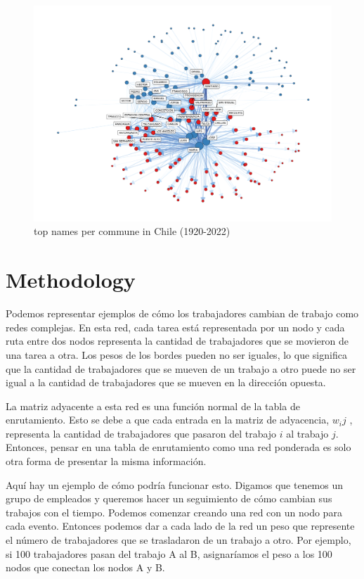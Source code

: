 \documentclass{article}
\begin{document}
\begin{figure}[H]
    \centering
    \includegraphics[width=13cm]{plot/names_commune_network.png}
    \caption{top names per commune in Chile (1920-2022)}
    \label{}
\end{figure}


\section{Methodology}

Podemos representar ejemplos de cómo los trabajadores cambian de trabajo como redes complejas. En esta red, cada tarea está representada por un nodo y cada ruta entre dos nodos representa la cantidad de trabajadores que se movieron de una tarea a otra. Los pesos de los bordes pueden no ser iguales, lo que significa que la cantidad de trabajadores que se mueven de un trabajo a otro puede no ser igual a la cantidad de trabajadores que se mueven en la dirección opuesta.

La matriz adyacente a esta red es una función normal de la tabla de enrutamiento. Esto se debe a que cada entrada en la matriz de adyacencia, \(w_ij \)  , representa la cantidad de trabajadores que pasaron del trabajo \( i\) al trabajo \( j \). Entonces, pensar en una tabla de enrutamiento como una red ponderada es solo otra forma de presentar la misma información.

Aquí hay un ejemplo de cómo podría funcionar esto. Digamos que tenemos un grupo de empleados y queremos hacer un seguimiento de cómo cambian sus trabajos con el tiempo. Podemos comenzar creando una red con un nodo para cada evento. Entonces podemos dar a cada lado de la red un peso que represente el número de trabajadores que se trasladaron de un trabajo a otro. Por ejemplo, si 100 trabajadores pasan del trabajo A al B, asignaríamos el peso a los 100 nodos que conectan los nodos A y B.
\end{document}
